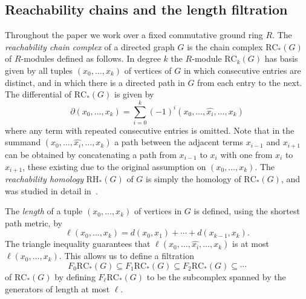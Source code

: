 \documentclass[a4paper, 11 pt, oneside, reqno]{amsart}
\numberwithin{lemma}{section}
\theoremstyle{definition}
\newcommand{\RC}{\mathrm{RC}}
\newcommand{\RH}{\mathrm{RH}}
\begin{document}
\subsection{Reachability chains and the length filtration}

Throughout the paper we work over a fixed commutative ground ring $R$.
The \emph{reachability chain complex} of a directed graph $G$
is the chain complex $\RC_\ast(G)$ of $R$-modules 
defined as follows.
In degree $k$ the \(R\)-module $\RC_k(G)$ has basis
given by all tuples $(x_0,\ldots,x_k)$ of vertices of $G$ in which
consecutive entries are distinct, and in which there is a directed
path in $G$ from each entry to the next.
The differential of $\RC_\ast(G)$ is given by
\begin{equation}\label{eq-differential}
    \partial(x_0,\ldots,x_k)
    =
    \sum_{i=0}^k
    (-1)^i
    (x_0,\ldots,\widehat{x_i},\ldots,x_k)
\end{equation}
where any term with repeated consecutive entries is omitted.
Note that in the summand
$(x_0,\ldots,\widehat{x_i},\ldots,x_k)$ a path between
the adjacent terms $x_{i-1}$ and $x_{i+1}$ can be obtained by 
concatenating a path from $x_{i-1}$ to $x_i$ with one from
$x_i$ to $x_{i+1}$, these existing due to the original assumption
on $(x_0,\ldots,x_k)$.
The \emph{reachability homology} $\RH_\ast(G)$ of $G$
is simply the homology of $\RC_\ast(G)$,
and was studied in detail in~\cite{HepworthRoff2023}.

The \emph{length} of a tuple $(x_0,\ldots,x_k)$ of vertices in \(G\) is defined, using the shortest path metric, by
\[
    \ell(x_0,\ldots,x_k)
    =
    d(x_0,x_1)+\cdots + d(x_{k-1},x_k).
\]
The triangle inequality guarantees that 
$\ell(x_0,\ldots,\widehat{x_i},\ldots,x_k)$ is at 
most $\ell(x_0,\ldots,x_k)$.
This allows us to define a filtration 
\[
    F_0\RC_\ast(G)
    \subseteq
    F_1\RC_\ast(G)
    \subseteq
    F_2\RC_\ast(G)
    \subseteq
    \cdots
\]
of $\RC_\ast(G)$ 
by defining $F_\ell\RC_\ast(G)$ to be the subcomplex spanned
by the generators of length at most $\ell$.
\end{document}
